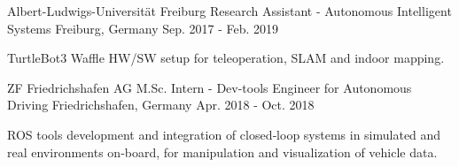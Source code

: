 \begin{cventries}
\cventry
    {Albert-Ludwigs-Universität Freiburg} %
    {Research Assistant - Autonomous Intelligent Systems} %
    {Freiburg, Germany} %
    {Sep. 2017 - Feb. 2019} %
    {
      \begin{cvitems} %
        \item {TurtleBot3 Waffle HW/SW setup for teleoperation, SLAM and indoor mapping.}
      \end{cvitems}
    }

\cventry
    {ZF Friedrichshafen AG} %
    {M.Sc. Intern - Dev-tools Engineer for Autonomous Driving} %
    {Friedrichshafen, Germany} %
    {Apr. 2018 - Oct. 2018} %
    {
      \begin{cvitems} %
        \item {ROS tools development and integration of closed‑loop systems in simulated and real environments on‑board, for manipulation and visualization of vehicle data.}
      \end{cvitems}
    }


\end{cventries}
